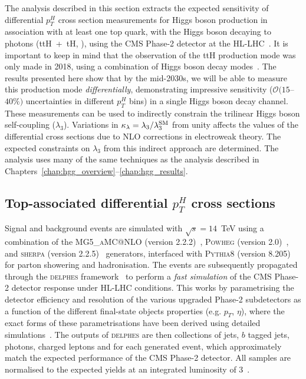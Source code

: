 The analysis described in this section extracts the expected sensitivity of differential $p^H_T$ cross section measurements for Higgs boson production in association with at least one top quark, with the Higgs boson decaying to photons (ttH~+~tH, \Hgg), using the CMS Phase-2 detector at the HL-LHC~\cite{CMS-PAS-FTR-18-020}. It is important to keep in mind that the observation of the ttH production mode was only made in 2018, using a combination of Higgs boson decay modes~\cite{Sirunyan:2018hoz,Aaboud:2018urx}. The results presented here show that by the mid-2030s, we will be able to measure this production mode \textit{differentially}, demonstrating impressive sensitivity ($\mathcal{O}(15$--$40\%)$ uncertainties in different $p_T^H$ bins) in a single Higgs boson decay channel. These measurements can be used to indirectly constrain the trilinear Higgs boson self-coupling ($\lambda_3$). Variations in $\kappa_\lambda = \lambda_3/\lambda_3^{\rm{SM}}$ from unity affects the values of the differential cross sections due to NLO corrections in electroweak theory. The expected constraints on $\lambda_3$ from this indirect approach are determined. The analysis uses many of the same techniques as the \Hgg analysis described in Chapters~\ref{chap:hgg_overview}--\ref{chap:hgg_results}.

\subsection{Top-associated differential $p_T^H$ cross sections}
Signal and background events are simulated with $\sqrt{s}=14$~TeV using a combination of the \textsc{MG5\_aMC@NLO} (version 2.2.2)~\cite{Alwall:2014hca}, \textsc{Powheg} (version 2.0)~\cite{Nason:2004rx,Frixione:2007vw,Alioli:2008tz,Nason:2009ai,Alioli:2010xd,Hartanto:2015uka}, and \textsc{sherpa} (version 2.2.5)~\cite{Gleisberg:2008ta} generators, interfaced with \textsc{Pythia8} (version 8.205)~\cite{Sjostrand:2014zea} for parton showering and hadronisation. The events are subsequently propagated through the \textsc{delphes} framework~\cite{deFavereau:2013fsa} to perform a \textit{fast simulation} of the CMS Phase-2 detector response under HL-LHC conditions. This works by parametrising the detector efficiency and resolution of the various upgraded Phase-2 subdetectors as a function of the different final-state objects properties (e.g. $p_T$, $\eta$), where the exact forms of these parametrisations have been derived using detailed simulations~\cite{Contardo:2020886}. The outputs of \textsc{delphes} are then collections of jets, $b$ tagged jets, photons, charged leptons and \met for each generated event, which approximately match the expected performance of the CMS Phase-2 detector. All samples are normalised to the expected yields at an integrated luminosity of 3~\abinv.

